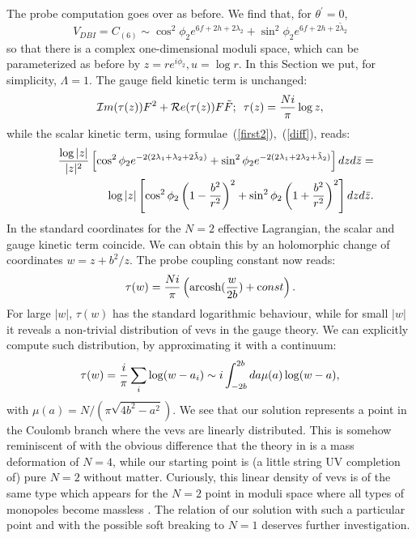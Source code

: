 \documentclass[a4paper,12pt]{article}
\begin{document}
The probe computation goes over as before. We find that,
for $\theta^\prime=0$,
\begin{equation}
V_{DBI}=C_{(6)}\sim\cos^2\phi_2e^{6f+2h+2\lambda_{2}}+
\sin^2\phi_2e^{6f+2h+2\tilde\lambda_{2}}
\label{pippo}
\end{equation}
so that there is a complex one-dimensional moduli space,
which can be parameterized as before by $z=re^{i\phi_2},
u=\log r$. In this Section we put, for simplicity, $\Lambda=1$.
The gauge field kinetic term is unchanged:
\begin{equation}
{\cal I}m(\tau(z))F^2+{\cal R}e(\tau(z))F\tilde{F};\,\,\, \tau(z)={Ni\over \pi}\log z ,
\label{gau}
\end{equation}
while the scalar kinetic term, using formulae~(\ref{first2}),~(\ref{diff}), reads:
\begin{eqnarray}
&&{\log|z|\over |z|^2}\left [ \cos^2\phi_2e^{-2(2\lambda_1+\lambda_2+2\tilde\lambda_{2})}+\sin^2\phi_2e^{-2(2\lambda_1+2\lambda_2+\tilde\lambda_2)}\right]dzd\bar z=\\\nonumber
&&\log|z|\left [ \cos^2\phi_2\left (1-{b^2\over r^2}\right )^2+\sin^2\phi_2\left (1+{b^2\over r^2}\right )^2\right ]dzd\bar z.
\label{sca}
\end{eqnarray}
In the standard coordinates for the $N=2$ effective Lagrangian, the scalar and gauge kinetic term coincide. We can 
obtain this by an holomorphic change of coordinates $w=z+
b^2/z$. The probe coupling constant now reads:
\begin{equation}
\tau(w)={Ni\over \pi}\left ( {\rm arcosh}({w\over 2b}) + {\mbox const}\right ).
\label{tau}
\end{equation}
For large $|w|$, $\tau(w)$  has the standard logarithmic behaviour, while for small $|w|$ it reveals a non-trivial
distribution of vevs in the gauge theory. We can explicitly compute such distribution, by approximating it 
with a continuum:
\begin{equation}
\tau(w)={i\over\pi}\sum_i \log(w-a_i)\sim i\int_{-2b}^{2b}da\mu (a)\log (w-a),
\label{tau2}
\end{equation}
with $\mu (a)=N/(\pi\sqrt{4b^2-a^2})$. We see that our solution
represents a point in the Coulomb branch where the vevs are
 linearly distributed. This is somehow
reminiscent of \cite{bpp}
with the obvious difference that the theory in \cite{bpp}
is a mass deformation of $N=4$,  while our starting point is (a little string UV completion of) pure $N=2$ without matter.
Curiously, this linear density of vevs is of the same type which
appears for the $N=2$ point in moduli space where all types of
monopoles become massless \cite{ds}. The relation of our 
solution with such a particular point and with the possible
soft breaking to $N=1$ deserves further investigation.
\end{document}
